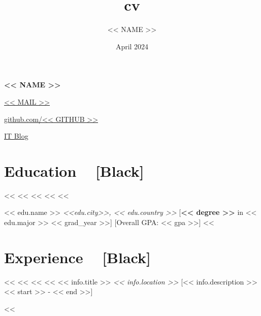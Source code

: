 \documentclass[10pt, a4paper]{article}
\title{cv}
\author{<< NAME >>}
\date{April 2024}
\newcommand{\myname}[1]{
        \color{black}
        \begin{center}
            {\LARGE \textbf{#1}}
        \end{center}
    }
\newcommand{\mysec}[1]{\section*{\color{black} \textbf{#1 ~} \xrfill[0.3\baselineskip]{0.1pt}[Black]}}
\newcommand{\hl}[1]{\textit{\color{Mahogany} #1}}
\begin{document}

    \myname{<< NAME >>} %
    
    \begin{center}
        \begin{linkset}
            \item \href{mailto:<< MAIL >>}{<< MAIL >>}
            \item \href{https://github.com/<< GITHUB >>}{github.com/<< GITHUB >>}
            \item \href{<< IT_BLOG >>}{IT Blog}
        \end{linkset}
    \end{center}

    
    \mysec{Education} %
        <<%
            <<%
            <<%
            <<%
            <<%

            \myitem
                {<< edu.name >> \hfill \hl{<<edu.city>>, << edu.country >>}}
                [\textbf{<< degree >>} in << edu.major >> \hfill \small << grad_year >>]
                [Overall GPA: << gpa >>]
        <<%


    \mysec{Experience} %
        <<%
            <<%
            <<%
            <<%
            \myitem
                {<< info.title >> \hfill \hl{<< info.location >>}}
                [<< info.description >> \hfill \small << start >> - << end >>]

        <<%
    
\end{document}

